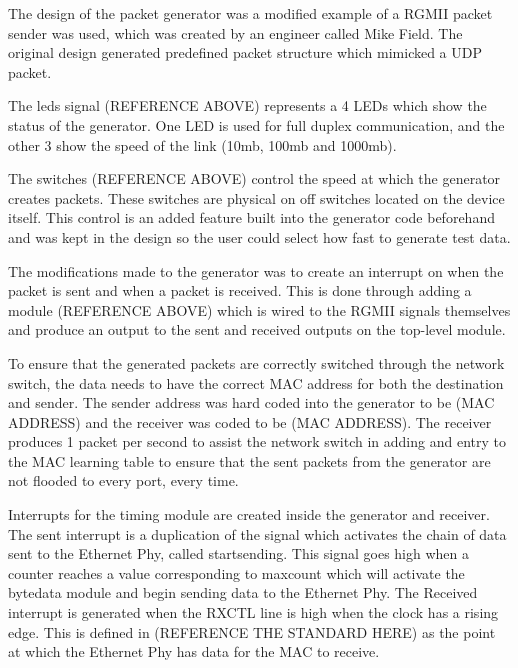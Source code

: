 The design of the packet generator was a modified example of a RGMII packet sender was used, which was created by an 
engineer called Mike Field. The original design generated predefined packet structure which mimicked a UDP packet. 



The leds signal (REFERENCE ABOVE) represents a 4 LEDs which show the status of the generator. One LED is used for 
full duplex communication, and the other 3 show the speed of the link (10mb, 100mb and 1000mb). 



The switches (REFERENCE ABOVE) control the speed at which the generator creates packets. These switches are physical 
on off switches located on the device itself.  This control is an added feature built into the generator code 
beforehand and was kept in the design so the user could select how fast to generate test data.



The modifications made to the generator was to create an interrupt on when the packet is sent and when a packet is 
received. This is done through adding a module (REFERENCE ABOVE) which is wired to the RGMII signals themselves and 
produce an output to the sent and received outputs on the top-level module.



To ensure that the generated packets are correctly switched through the network switch, the data needs to have the 
correct MAC address for both the destination and sender. The sender address was hard coded into the generator to be 
(MAC ADDRESS) and the receiver was coded to be (MAC ADDRESS). The receiver produces 1 packet per second to assist 
the network switch in adding and entry to the MAC learning table to ensure that the sent packets from the generator 
are not flooded to every port, every time. 

Interrupts for the timing module are created inside the generator and receiver. The sent interrupt is a duplication 
of the signal which activates the chain of data sent to the Ethernet Phy, called start\textunderscore sending. This 
signal goes high when a counter reaches a value corresponding to max\textunderscore count which will activate the 
byte\textunderscore data module and begin sending data to the Ethernet Phy. The Received interrupt is generated when 
the RX\textunderscore CTL line is high when the clock has a rising edge. This is defined in (REFERENCE THE STANDARD 
HERE) as the point at which the Ethernet Phy has data for the MAC to receive. 

